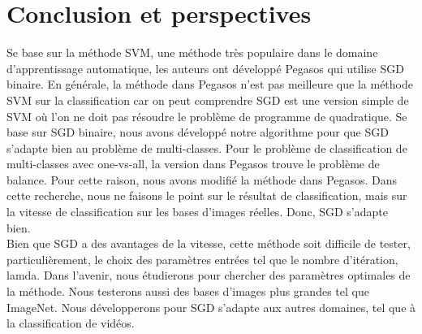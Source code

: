 \chapter{Conclusion et perspectives}
\label{chap:con}

Se base sur la méthode SVM, une méthode très populaire dans le domaine d'apprentissage automatique, les auteurs ont développé Pegasos \cite{sss07} qui utilise SGD binaire. En générale, la méthode dans Pegasos n'est pas meilleure que la méthode SVM sur la classification car on peut comprendre SGD est une version simple de SVM où l'on ne doit pas résoudre le problème de programme de quadratique. Se base sur SGD binaire, nous avons développé notre algorithme pour que SGD s'adapte bien au problème de multi-classes. Pour le problème de classification de multi-classes avec one-vs-all, la version dans Pegasos trouve le problème de balance. Pour cette raison, nous avons modifié la méthode dans Pegasos. Dans cette recherche, nous ne faisons le point sur le résultat de classification, mais sur la vitesse de classification sur les bases d'images réelles. Donc, SGD s'adapte bien.\\

Bien que SGD a des avantages de la vitesse, cette méthode soit difficile de tester, particulièrement, le choix des paramètres entrées tel que le nombre d'itération, lamda. Dans l'avenir, nous étudierons pour chercher des paramètres optimales de la méthode. Nous testerons aussi des bases d'images plus grandes tel que ImageNet. Nous développerons pour SGD s'adapte aux autres domaines, tel que à la classification de vidéos.